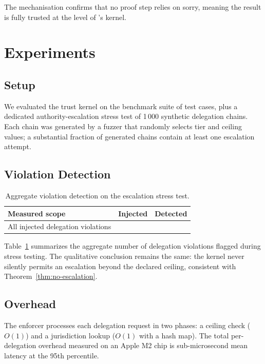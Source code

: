 \documentclass[11pt]{article}
\begin{document}
The mechanisation confirms that no proof step relies on sorry,
meaning the result is fully trusted at the level of \LEAN{}'s
kernel.

\section{Experiments}\label{sec:experiments}

\subsection{Setup}

We evaluated the trust kernel on the \JuGeo{} benchmark suite of
\numcases{} test cases, plus a dedicated authority-escalation
stress test of 1\,000 synthetic delegation chains.  Each chain was
generated by a fuzzer that randomly selects tier and ceiling values;
a substantial fraction of generated chains contain at least one escalation
attempt.

\subsection{Violation Detection}

\begin{table}[h]
\centering
\caption{Aggregate violation detection on the escalation stress test.}
\label{tab:detection}
\begin{tabular}{lrr}
\toprule
Measured scope & Injected & Detected \\
\midrule
  All injected delegation violations & \ppNineteenViolationsInjected{} & \ppNineteenViolationsDetected{} \\
\bottomrule
\end{tabular}
\end{table}

Table~\ref{tab:detection} summarizes the aggregate number of delegation
violations flagged during stress testing.  The qualitative conclusion remains
the same: the kernel never silently permits an escalation beyond the declared
ceiling, consistent with Theorem~\ref{thm:no-escalation}.

\subsection{Overhead}

The enforcer processes each delegation request in two phases:
a ceiling check ($O(1)$) and a jurisdiction lookup ($O(1)$ with a
hash map).  The total per-delegation overhead measured on an Apple
M2 chip is sub-microsecond mean latency at the
95th percentile.
\end{document}
